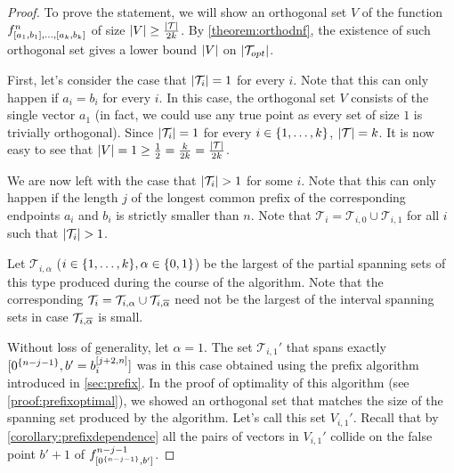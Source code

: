 \begin{proof}
To prove the statement,
we will show an orthogonal set $V$ of the function
$f^n_{[a_1, b_1], \ldots, [a_k, b_k]}$
of size
$\lvert V\rvert \geq \frac{\lvert\mathcal{T}\rvert}{2k}$.
By \autoref{theorem:orthodnf},
the existence of such orthogonal set
gives a lower bound $\lvert V\rvert$
on $\lvert\mathcal{T}_{opt}\rvert$.

First, let's consider the case that
$\lvert\mathcal{T}_i\rvert = 1$ for every $i$.
Note that this can only happen if
$a_i = b_i$ for every $i$.
In this case,
the orthogonal set $V$ consists of the single vector $a_1$
(in fact, we could use any true point
as every set of size $1$ is trivially orthogonal).
Since $\lvert\mathcal{T}_i\rvert = 1$
for every $i \in \{1, \ldots, k\}$,
$\lvert\mathcal{T}\rvert = k$.
It is now easy to see that
$\lvert V\rvert = 1
\geq \frac{1}{2} = \frac{k}{2k} =
\frac{\lvert\mathcal{T}\rvert}{2k}$.

We are now left with the case that
$\lvert\mathcal{T}_i\rvert > 1$ for some $i$.
Note that this can only happen if
the length $j$
of the longest common prefix
of the corresponding endpoints $a_i$ and $b_i$
is strictly smaller than $n$.
Note that
$\mathcal{T}_i
= \mathcal{T}_{i,0} \cup \mathcal{T}_{i,1}$
for all $i$ such that $\lvert\mathcal{T}_i\rvert > 1$.

Let $\mathcal{T}_{i, \alpha}$
($i \in \{1, \ldots, k\}, \alpha \in \{0, 1\}$)
be the largest
of the partial spanning sets of this type
produced during the course of the algorithm.
Note that the corresponding
$\mathcal{T}_i
= \mathcal{T}_{i, \alpha}
\cup \mathcal{T}_{i, \overline{\alpha}}$
need not be the largest of the interval spanning sets
in case
$\mathcal{T}_{i, \overline{\alpha}}$ is small.

Without loss of generality,
let $\alpha = 1$.
The set $\mathcal{T}_{i, 1}'$
that spans exactly
$[0^{\{n-j-1\}}, b' = b_i^{[j+2, n]}]$
was in this case obtained
using the prefix algorithm
introduced in \cref{sec:prefix}.
In the proof of optimality of this algorithm
(see \autoref{proof:prefixoptimal}),
we showed an orthogonal set that matches the size
of the spanning set produced by the algorithm.
Let's call this set $V_{i, 1}'$.
Recall that by \cref{corollary:prefixdependence}
all the pairs of vectors in $V_{i, 1}'$
collide on the false point $b' + 1$
of $f^{n-j-1}_{[0^{\{n-j-1\}}, b']}$.


\end{proof}
